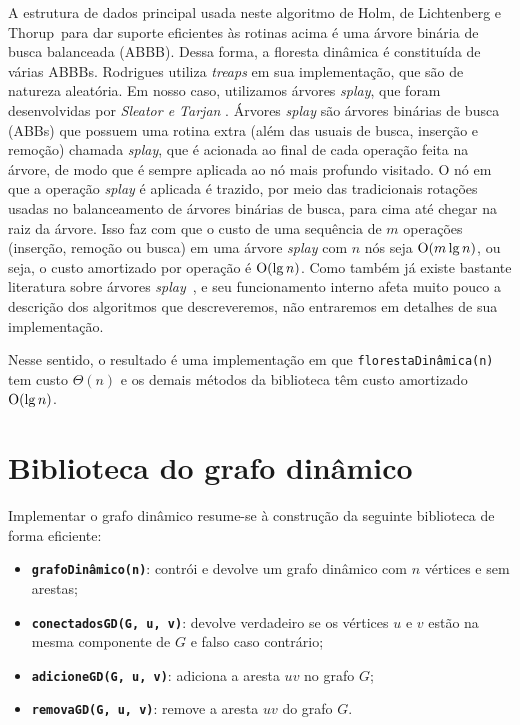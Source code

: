 A estrutura de dados principal usada neste algoritmo de Holm, de Lichtenberg e Thorup~para dar suporte eficientes às rotinas acima é uma árvore binária de busca balanceada (ABBB). Dessa forma, a floresta dinâmica é constituída de várias ABBBs. Rodrigues utiliza \textit{treaps} em sua implementação, que são de natureza aleatória. Em nosso caso, utilizamos árvores \textit{splay}, que foram desenvolvidas por \textit{Sleator e Tarjan} \cite{sleator}. Árvores \textit{splay} são árvores binárias de busca (ABBs) que possuem uma rotina extra (além das usuais de busca, inserção e remoção) chamada \textit{splay}, que é acionada ao final de cada operação feita na árvore, de modo que é sempre aplicada ao nó mais profundo visitado. O nó em que a operação \textit{splay} é aplicada é trazido, por meio das tradicionais rotações usadas no balanceamento de árvores binárias de busca, para cima até chegar na raiz da árvore. Isso faz com que o custo de uma sequência de $m$ operações (inserção, remoção ou busca) em uma árvore \textit{splay} com $n$ nós seja $\mathrm{O}(m\lg n)$, ou seja, o custo amortizado por operação é $\mathrm{O}(\lg n)$. Como também já existe bastante literatura sobre árvores \textit{splay}~\cite[Lecture 12]{kozen}, e seu funcionamento interno afeta muito pouco a descrição dos algoritmos que descreveremos, não entraremos em detalhes de sua implementação.

Nesse sentido, o resultado é uma implementação em que \texttt{florestaDinâmica(n)} tem custo $\Theta(n)$ e os demais métodos da biblioteca têm custo amortizado $\mathrm{O}(\lg n)$.

\section{Biblioteca do grafo dinâmico}
\label{sec:dynamic-graph-structure}

Implementar o grafo dinâmico resume-se à construção da seguinte biblioteca de forma eficiente:

\begin{itemize}
    \item \texttt{\textbf{grafoDinâmico(n)}}: contrói e devolve um grafo dinâmico com $n$ vértices e sem arestas;
    \item \texttt{\textbf{conectadosGD(G, u, v)}}: devolve verdadeiro se os vértices $u$ e $v$ estão na mesma componente de $G$ e falso caso contrário;
    \item \texttt{\textbf{adicioneGD(G, u, v)}}: adiciona a aresta $uv$ no grafo $G$;
    \item \texttt{\textbf{removaGD(G, u, v)}}: remove a aresta $uv$ do grafo $G$.
\end{itemize} 

